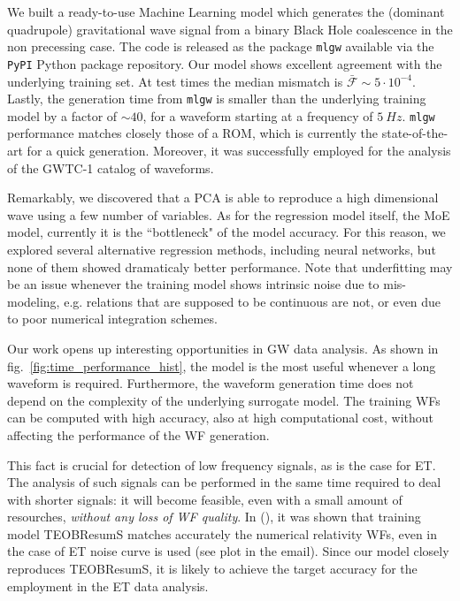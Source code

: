 We built a ready-to-use Machine Learning model which generates the (dominant quadrupole) gravitational wave signal from a binary Black Hole coalescence in the non precessing case. The code is released as the package \texttt{mlgw} available via the \texttt{PyPI} Python package repository.
Our model shows excellent agreement with the underlying training set. At test times the median mismatch is $\bar{\mathcal{F}}\sim 5 \cdot 10^{-4}$. Lastly, the generation time from \texttt{mlgw} is smaller than the underlying training model by a factor of $\sim 40$, for a waveform starting at a frequency of $\SI{5}{Hz}$.
\texttt{mlgw} performance matches closely those of a ROM, which is currently the state-of-the-art for a quick generation.
Moreover, it was successfully employed for the analysis of the GWTC-1 catalog of waveforms.
\par
Remarkably, we discovered that a PCA is able to reproduce a high dimensional wave using a few number of variables. As for the regression model itself, the MoE model, currently it is the ``bottleneck" of the model accuracy. For this reason, we explored several alternative regression methods, including neural networks, but none of them showed dramaticaly better performance.
Note that underfitting may be an issue whenever the training model shows intrinsic noise due to mis-modeling, e.g. relations that are supposed to be continuous are not, or even due to poor numerical integration schemes.
\par
Our work opens up interesting opportunities in GW data analysis.
As shown in fig.~\ref{fig:time_performance_hist}, the model is the most useful whenever a long waveform is required. Furthermore, the waveform generation time does not depend on the complexity of the underlying surrogate model. The training WFs can be computed with high accuracy, also at high computational cost, without affecting the performance of the WF generation.
\par
This fact is crucial for detection of low frequency signals, as is the case for ET. The analysis of such signals can be performed in the same time required to deal with shorter signals: it will become feasible, even with a small amount of resourches, \textit{without any loss of WF quality}.
In \cite{} (), it was shown that training model TEOBResumS matches accurately the numerical relativity WFs, even in the case of ET noise curve is used (see plot in the email). Since our model closely reproduces TEOBResumS, it is likely to achieve the target accuracy for the employment in the ET data analysis.
\par


